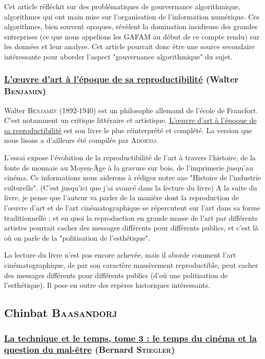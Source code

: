 \documentclass[a4paper,10pt]{article}
\begin{document}
Cet article réfléchit sur des problématiques de gourvernance algorithmique, algorithmes qui ont main mise sur l'organisation de l'information numérique. Ces algorithmes, bien souvent opaques, révèlent la domination insidieuse des grandes entreprises (ce que nous appelions les GAFAM au début de ce compte rendu) sur les données et leur analyse. Cet article pourrait donc être une source secondaire intéressante pour aborder l'aspect "gouvernance algorithmique" du sujet.

\subsubsection{\underline{L'\oe{}uvre d'art à l'époque de sa reproductibilité} (Walter \textsc{Benjamin})}

Walter \textsc{Benjamin} (1892-1940)  est un philosophe allemand de l'école de Francfort. C'est notamment un critique littéraire et artistique. \underline{L'\oe{}uvre d'art à l'époque de sa reproductibilité} est son livre le plus réinterprété et complété. La version que nous lisons a d'ailleurs été compilée par \textsc{Adorno}.

L'essai expose l'évolution de la reproductibilité de l'art à travers l'histoire, de la fonte de monnaie au Moyen-Âge à la gravure sur bois, de l'imprimerie jusqu'au cinéma.
Ce informations nous aiderons à rédigez notre axe "Histoire de l'industrie culturelle". (C'est jusqu'ici que j'ai avancé dans la lecture du livre)
A la suite du livre, je pense que l'auteur va parler de la manière dont la reproduction de l’\oe{}uvre d’art et de l'art cinématographique se répercutent sur l’art dans sa forme traditionnelle ; et en quoi la reproduction en grande masse de l'art par différents artistes pourrait cacher des messages différents pour différents publics, et c'est là où on parle de la "politisation de l'esthétique".

La lecture du livre n'est pas encore achevée, mais il aborde comment l'art cinématographique, de par son caractère massivement reproductible, peut cacher des messages différents pour différents publics (d'où une politisation de l'esthétique). Il pose en outre des repères historiques intéressants.

\subsection{Chinbat \textsc{Baasandorj}}

\subsubsection{\underline{La technique et le temps, tome 3 : le temps du cinéma et la question du mal-être} (Bernard \textsc{Stiegler})}
\end{document}
